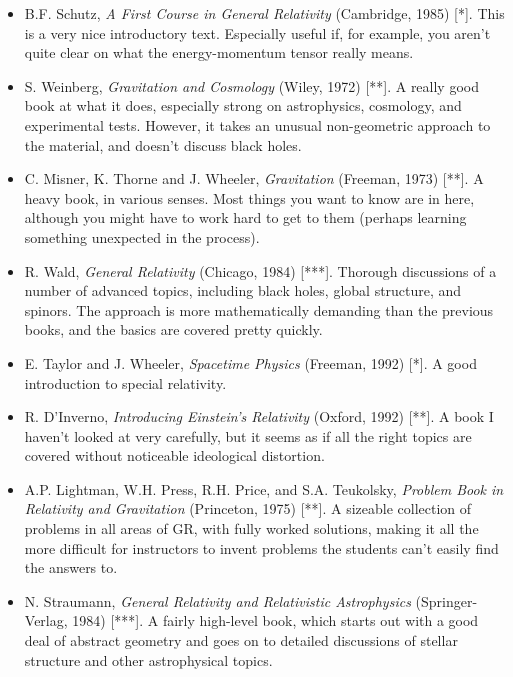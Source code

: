 \begin{itemize}

\item B.F. Schutz, {\sl A First Course in General Relativity} (Cambridge,
1985) [*].  This is a very nice introductory text.  Especially useful
if, for example, you aren't quite clear on what the energy-momentum
tensor really means.

\item S. Weinberg, {\sl Gravitation and Cosmology} (Wiley, 1972) [**].
A really good book at what it does, especially strong on astrophysics, 
cosmology, and experimental tests.  However, it takes
an unusual non-geometric approach to the material, and 
doesn't discuss black holes.

\item C. Misner, K. Thorne and J. Wheeler, {\sl Gravitation}
(Freeman, 1973) [**].  A heavy book, in various senses.  Most things
you want to know are in here, although you might have to work hard
to get to them (perhaps learning something unexpected in the process).

\item R. Wald, {\sl General Relativity} (Chicago, 1984) [***].  Thorough
discussions of a number of advanced topics, including black holes,
global structure, and spinors.  The approach is more mathematically 
demanding than the previous books, and the basics are covered pretty quickly.

\item E. Taylor and J. Wheeler, {\sl Spacetime Physics} (Freeman, 1992)
[*].  A good introduction to special relativity.

\item R. D'Inverno, {\sl Introducing Einstein's Relativity} (Oxford, 1992)
[**].  A book I haven't looked at very carefully, but it seems as if all the
right topics are covered without noticeable ideological distortion.

\item A.P. Lightman, W.H. Press, R.H. Price, and S.A. Teukolsky,
{\sl Problem Book in Relativity and Gravitation} (Princeton, 1975) [**].
A sizeable collection of problems in all areas of GR, with fully
worked solutions, making it all the more difficult for instructors
to invent problems the students can't easily find the answers to.

\item N. Straumann, {\sl General Relativity and Relativistic Astrophysics}
(Springer-Verlag, 1984) [***].  A fairly high-level book, which starts out 
with a good deal of abstract geometry and goes on to detailed discussions
of stellar structure and other astrophysical topics.


\end{itemize}
